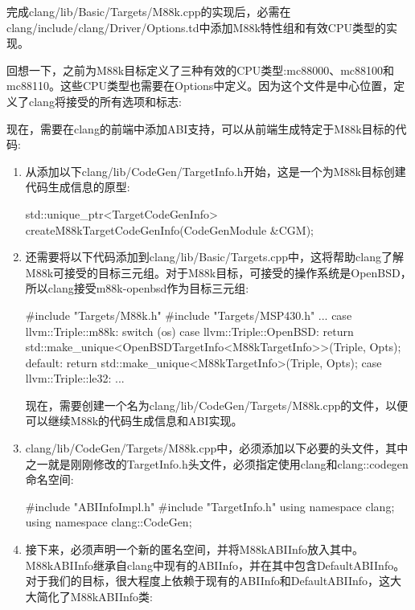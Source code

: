 完成clang/lib/Basic/Targets/M88k.cpp的实现后，必需在clang/include/clang/Driver/Options.td中添加M88k特性组和有效CPU类型的实现。

回想一下，之前为M88k目标定义了三种有效的CPU类型:mc88000、mc88100和mc88110。这些CPU类型也需要在Options中定义。因为这个文件是中心位置，定义了clang将接受的所有选项和标志:


现在，需要在clang的前端中添加ABI支持，可以从前端生成特定于M88k目标的代码:

\begin{enumerate}
\item
从添加以下clang/lib/CodeGen/TargetInfo.h开始，这是一个为M88k目标创建代码生成信息的原型:

\begin{cpp}
std::unique_ptr<TargetCodeGenInfo>
createM88kTargetCodeGenInfo(CodeGenModule &CGM);
\end{cpp}

\item
还需要将以下代码添加到clang/lib/Basic/Targets.cpp中，这将帮助clang了解M88k可接受的目标三元组。对于M88k目标，可接受的操作系统是OpenBSD，所以clang接受m88k-openbsd作为目标三元组:

\begin{cpp}
#include "Targets/M88k.h"
#include "Targets/MSP430.h"
...
    case llvm::Triple::m88k:
        switch (os) {
            case llvm::Triple::OpenBSD:
            return std::make_unique<OpenBSDTargetInfo<M88kTargetInfo>>(Triple, Opts);
        default:
            return std::make_unique<M88kTargetInfo>(Triple, Opts);
        }
    case llvm::Triple::le32:
...
\end{cpp}

现在，需要创建一个名为clang/lib/CodeGen/Targets/M88k.cpp的文件，以便可以继续M88k的代码生成信息和ABI实现。

\item
clang/lib/CodeGen/Targets/M88k.cpp中，必须添加以下必要的头文件，其中之一就是刚刚修改的TargetInfo.h头文件，必须指定使用clang和clang::codegen命名空间:

\begin{cpp}
#include "ABIInfoImpl.h"
#include "TargetInfo.h"
using namespace clang;
using namespace clang::CodeGen;
\end{cpp}

\item
接下来，必须声明一个新的匿名空间，并将M88kABIInfo放入其中。M88kABIInfo继承自clang中现有的ABIInfo，并在其中包含DefaultABIInfo。对于我们的目标，很大程度上依赖于现有的ABIInfo和DefaultABIInfo，这大大简化了M88kABIInfo类:


\end{enumerate}
